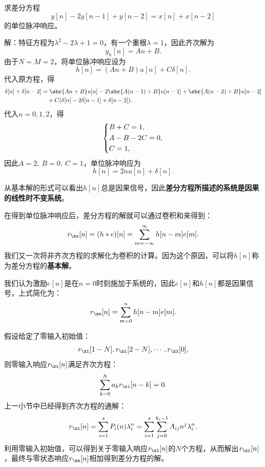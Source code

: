 \begin{example}
    求差分方程
    \begin{equation}
        y[n]-2y[n-1]+y[n-2]=x[n]+x[n-2]
    \end{equation}
    的单位脉冲响应。

    解：特征方程为$\lambda^2-2\lambda+1=0$，有一个重根$\lambda=1$，因此齐次解为
    \begin{equation}
        y_h[n]=A n+B.
    \end{equation}
    由于$N=M=2$，将单位脉冲响应设为
    \begin{equation}
        h[n]=(A n+B)u[n]+C\delta[n].
    \end{equation}
    代入原方程，得
    \begin{align}
        \delta[n]+\delta[n-2]&=\sbr{An+B}u[n]-2\sbr{A(n-1)+B}u[n-1]+\sbr{A(n-2)+B}u[n-2]\nonumber\\
        &\quad+C(\delta[n]-2\delta[n-1]+\delta[n-2]).
    \end{align}
    代入$n=0,1,2$，得
    \begin{equation}
        \begin{dcases}
            B+C=1,\\
            A-B-2C=0,\\
            C=1,
        \end{dcases}
    \end{equation}
    因此$A=2,\ B=0,\ C=1$，单位脉冲响应为
    \begin{equation}
        h[n]=2n u[n]+\delta[n].
    \end{equation}
\end{example}

从基本解的形式可以看出$h[n]$总是因果信号，因此\textbf{差分方程所描述的系统是因果的线性时不变系统}。

在得到单位脉冲响应后，差分方程的解就可以通过卷积和来得到：
\begin{equation}
    r_{\zs}[n]=(h*e)[n]=\sum_{m=-\infty}^{\infty}h[n-m]e[m].
\end{equation}
我们又一次将非齐次方程的求解化为卷积的计算。因为这个原因，可以将$h[n]$称为差分方程的\textbf{基本解}。

我们认为激励$e[n]$是在$n=0$时刻施加于系统的，因此$e[n]$和$h[n]$都是因果信号，上式简化为：
\begin{equation}
    r_{\zs}[n]=\sum_{m=0}^{n}h[n-m]e[m].
\end{equation}

假设给定了零输入初始值：
\begin{equation}
    r_{\zi}[1-N],r_{\zi}[2-N],\cdots,r_{\zi}[0],
\end{equation}
则零输入响应$r_{\zi}[n]$满足齐次方程：
\begin{equation}
    \sum_{k=0}^{N}a_k r_{\zi}[n-k]=0.
\end{equation}
上一小节中已经得到齐次方程的通解：
\begin{equation}
    r_{\zi}[n]=\sum_{i=1}^{s}P_i(n) \lambda_i^n=\sum_{i=1}^{s}\sum_{j=0}^{k_i-1}A_{ij} n^j \lambda_i^n.
\end{equation}
利用零输入初始值，可以得到关于零输入响应$r_{\zi}[n]$的$N$个方程，从而解出$r_{\zi}[n]$，最终与零状态响应$r_{\zs}[n]$相加得到差分方程的解。


